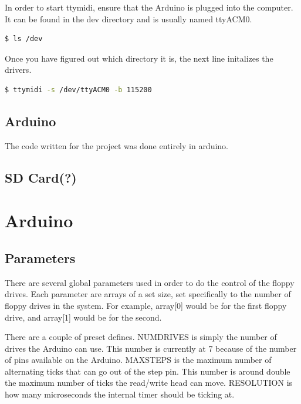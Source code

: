 \documentclass[11pt, a4paper]{report}
\begin{document}
In order to start ttymidi, ensure that the Arduino is plugged into the computer. It can be found in the dev directory and is usually named ttyACM0. 

\begin{lstlisting}[language=bash]
  $ ls /dev
\end{lstlisting}

Once you have figured out which directory it is, the next line initalizes the drivers.

\begin{lstlisting}[language=bash]
  $ ttymidi -s /dev/ttyACM0 -b 115200
\end{lstlisting}






\section{Arduino}

The code written for the project was done entirely in arduino.

\section{SD Card(?)}

\chapter{Arduino}

\section{Parameters}
There are several global parameters used in order to do the control of the floppy drives. Each parameter are arrays of a set size, set specifically to the number of floppy drives in the system. For example, array[0] would be for the first floppy drive, and array[1] would be for the second. 



There are a couple of preset defines. NUMDRIVES is simply the number of drives the Arduino can use. This number is currently at 7 because of the number of pins available on the Arduino. MAXSTEPS is the maximum number of alternating ticks that can go out of the step pin. This number is around double the maximum number of ticks the read/write head can move. RESOLUTION is how many microseconds the internal timer should be ticking at. \\
\end{document}
